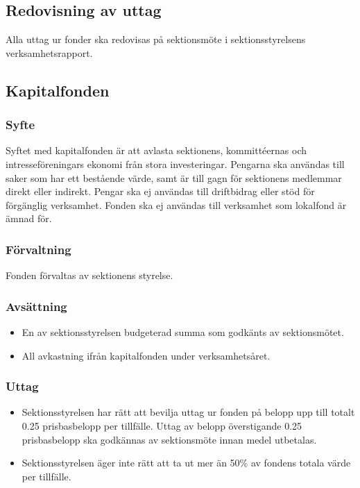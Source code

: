 \documentclass[a4paper]{dtek}
\newcommand{\prisbasbelopp}[1]{
    #1 prisbasbelopp
    \ifdef{\nuvarandeprisbasbelopp}{
        \marginpar{
            \small{ \textbf{\roundandprint{\xintiexpr#1 * \nuvarandeprisbasbelopp\relax}kr}}
        }
    }{}
}
\begin{document}
\subsection{Redovisning av uttag}
Alla uttag ur fonder ska redovisas på sektionsmöte i sektionsstyrelsens verksamhetsrapport.

\subsection{Kapitalfonden}
\subsubsection{Syfte}
\label{sec:kapitalfond_syfte}
Syftet med kapitalfonden är att avlasta sektionens, kommittéernas och intresseföreningars ekonomi från stora investeringar. Pengarna ska användas till saker som har ett bestående värde, samt är till gagn för sektionens medlemmar direkt eller indirekt. Pengar ska ej användas till driftbidrag eller stöd för förgänglig verksamhet. Fonden ska ej användas till verksamhet som lokalfond är ämnad för.
\subsubsection{Förvaltning}
Fonden förvaltas av sektionens styrelse.
\subsubsection{Avsättning}
\begin{itemize}
\item En av sektionsstyrelsen budgeterad summa som godkänts av sektionsmötet.
\item All avkastning ifrån kapitalfonden under verksamhetsåret.
\end{itemize}
\subsubsection{Uttag}
\begin{itemize}
\item Sektionsstyrelsen har rätt att bevilja uttag ur fonden på belopp upp till totalt \prisbasbelopp{0.25} per tillfälle. Uttag av belopp överstigande \prisbasbelopp{0.25} ska godkännas av sektionsmöte innan medel utbetalas.
\item Sektionsstyrelsen äger inte rätt att ta ut mer än 50\% av fondens totala värde per tillfälle.
\end{itemize}
\end{document}
